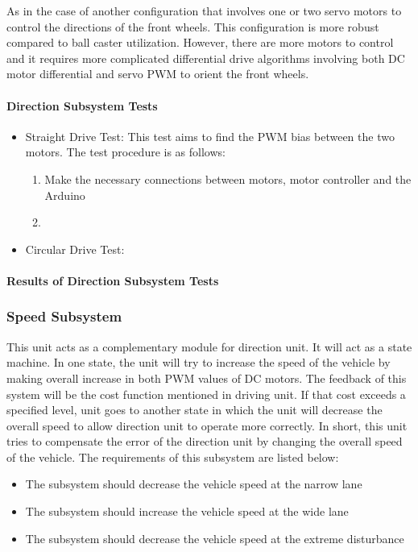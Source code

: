 \documentclass[a4paper,12pt]{article}
\begin{document}
	As in the case of another configuration that involves one or two servo motors to control the directions of the front wheels. This configuration is more robust compared to ball caster utilization. However, there are more motors to control and it requires more complicated differential drive algorithms involving both DC motor differential and servo PWM to orient the front wheels.
	
	\paragraph{Direction Subsystem Tests}
	\begin{itemize}
	
		\item Straight Drive Test:
			This test aims to find the PWM bias between the two motors. The test procedure is as follows:
			\begin{enumerate}
				\item Make the necessary connections between motors, motor controller and the Arduino \vspace{-0.2cm}
				\item 
			\end{enumerate}
				
		
		\item Circular Drive Test:
		
		
	\end{itemize}
	
	\paragraph{Results of Direction Subsystem Tests}
	
	
	\subsubsection{Speed Subsystem}
	
	This unit acts as a complementary module for direction unit. It will act as a state machine. In one state, the unit will try to increase the speed of the vehicle by making overall increase in both PWM values of DC motors. The feedback of this  system will be the cost function mentioned in driving unit. If that cost exceeds a specified level, unit goes to another state in which the unit will decrease the overall speed to allow direction unit to operate more correctly. In short, this unit tries to compensate the error of the direction unit by changing the overall speed of the vehicle. The requirements of this subsystem are listed below:
	\begin{itemize}
		\item The subsystem should decrease the vehicle speed at the narrow lane 
		\item The subsystem should increase the vehicle speed at the wide lane 
		\item The subsystem should decrease the vehicle speed at the extreme disturbance  
	\end{itemize}
	
\end{document}
